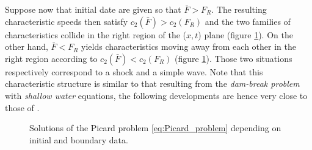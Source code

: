 Suppose now that initial date are given so that $\bar{F} > F_R$. The resulting characteristic speeds then satisfy $c_2(\bar{F})>c_2(F_R)$ and the two families of characteristics collide in the right region of the ($x,t$) plane (figure \ref{fig:Picard_problem}). On the other hand, $\bar{F} < F_R$ yields characteristics moving away from each other in the right region according to $c_2(\bar{F})<c_2(F_R)$ (figure \ref{fig:Picard_problem}). Those two situations respectively correspond to a shock and a simple wave. Note that this characteristic structure is similar to that resulting from the \textit{dam-break problem} with \textit{shallow water} equations, the following developments are hence very close to those of \cite[Ch.13]{Leveque}.
\begin{figure}[h!]
  \centering
 \caption{Solutions of the Picard problem \eqref{eq:Picard_problem} depending on initial and boundary data.}
  \label{fig:Picard_problem}
\end{figure}


